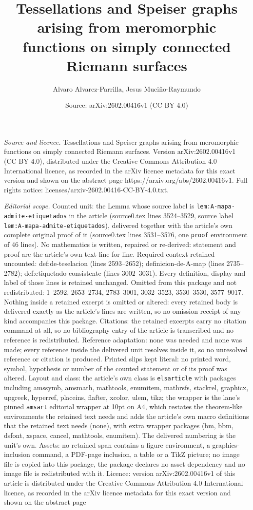 \documentclass[10pt,a4paper]{amsart}
\title[Tessellations and Speiser graphs arising from meromorphic fu]{Tessellations and Speiser graphs arising from meromorphic functions on simply connected Riemann surfaces}
\author{Alvaro Alvarez-Parrilla, Jesus Muci\~no-Raymundo}
\date{Source: arXiv:2602.00416v1 (CC BY 4.0)}
\begin{document}
\maketitle

\noindent\emph{Source and licence.} Tessellations and Speiser graphs arising from meromorphic functions on simply connected Riemann surfaces. Version arXiv:2602.00416v1 (CC BY 4.0), distributed under the Creative Commons Attribution 4.0 International licence, as recorded in the arXiv licence metadata for this exact version and shown on the abstract page https://arxiv.org/abs/2602.00416v1. Full rights notice: licenses/arxiv-2602.00416-CC-BY-4.0.txt.\par\smallskip

\noindent\textit{Editorial scope.} Counted unit: the Lemma whose source label is \texttt{lem:A-mapa-admite-etiquetados} in the article (source0.tex lines 3524--3529, source label \texttt{lem:A-mapa-admite-etiquetados}), delivered together with the article's own complete original proof of it (source0.tex lines 3531--3576, one \texttt{proof} environment of 46 lines). No mathematics is written, repaired or re-derived: statement and proof are the article's own text line for line. Required context retained uncounted: def:de-teselacion (lines 2593--2652); definicion-de-A-map (lines 2735--2782); def:etiquetado-consistente (lines 3002--3031). Every definition, display and label of those lines is retained unchanged. Omitted from this package and not redistributed: 1--2592, 2653--2734, 2783--3001, 3032--3523, 3530--3530, 3577--9017. Nothing inside a retained excerpt is omitted or altered: every retained body is delivered exactly as the article's lines are written, so no omission receipt of any kind accompanies this package. Citations: the retained excerpts carry no citation command at all, so no bibliography entry of the article is transcribed and no reference is redistributed. Reference adaptation: none was needed and none was made; every reference inside the delivered unit resolves inside it, so no unresolved reference or citation is produced. Printed slips kept literal: no printed word, symbol, hypothesis or number of the counted statement or of its proof was altered. Layout and class: the article's own class is \texttt{elsarticle} with packages including amssymb, amsmath, mathtools, enumitem, mathrsfs, stackrel, graphicx, upgreek, hyperref, placeins, flafter, xcolor, ulem, tikz; the wrapper is the lane's pinned \texttt{amsart} editorial wrapper at 10pt on A4, which restates the theorem-like environments the retained text needs and adds the article's own macro definitions that the retained text needs (none), with extra wrapper packages (bm, bbm, dsfont, xspace, cancel, mathtools, enumitem). The delivered numbering is the unit's own. Assets: no retained span contains a figure environment, a graphics-inclusion command, a PDF-page inclusion, a table or a TikZ picture; no image file is copied into this package, the package declares no asset dependency and no image file is redistributed with it. Licence: version arXiv:2602.00416v1 of this article is distributed under the Creative Commons Attribution 4.0 International licence, as recorded in the arXiv licence metadata for this exact version and shown on the abstract page 
\end{document}
